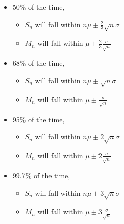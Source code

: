 \documentclass[10pt,landscape]{article}
\newcommand{\Green}[1]{\noindent{\textbf{\textcolor{PineGreen}{#1 -}}}}
\begin{document}
\begin{multicols}{4}
\Green{Emperical Rules under CLT}
\begin{itemize}
    \item 50\% of the time,\begin{itemize}
        \item $S_n$ will fall within $n\mu \pm \frac{2}{3}\sqrt{n} \sigma$
        \item $M_n$ will fall within $\mu \pm \frac{2}{3}\frac{\sigma}{\sqrt{n}}$
    \end{itemize}
    \item 68\% of the time,\begin{itemize}
        \item $S_n$ will fall within $n\mu \pm \sqrt{n} \sigma$
        \item $M_n$ will fall within $\mu \pm \frac{\sigma}{\sqrt{n}}$
    \end{itemize}
    \item 95\% of the time,\begin{itemize}
        \item $S_n$ will fall within $n\mu \pm 2\sqrt{n} \sigma$
        \item $M_n$ will fall within $\mu \pm 2\frac{\sigma}{\sqrt{n}}$
    \end{itemize}
    \item 99.7\% of the time,\begin{itemize}
        \item $S_n$ will fall within $n\mu \pm 3\sqrt{n} \sigma$
        \item $M_n$ will fall within $\mu \pm 3\frac{\sigma}{\sqrt{n}}$
    \end{itemize}
\end{itemize}

\end{multicols}
\end{document}
